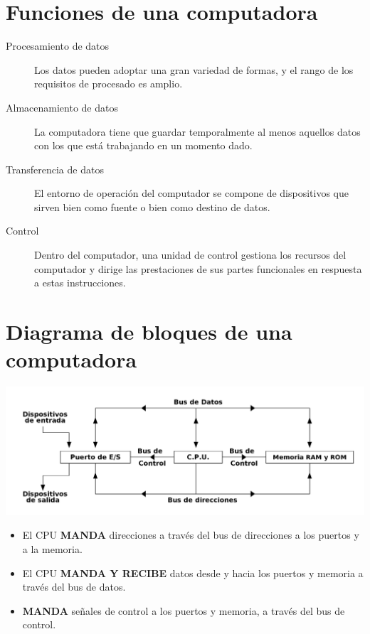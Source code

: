\documentclass[11pt]{article}
\begin{document}
\section{Funciones de una computadora}
\label{sec:org8c094fa}
\begin{description}
\item[{Procesamiento de datos}] Los datos pueden adoptar una gran variedad de formas, y el rango de los requisitos de procesado es amplio.

\item[{Almacenamiento de datos}] La computadora tiene que guardar temporalmente al menos aquellos datos con los que está trabajando en un momento dado.

\item[{Transferencia de datos}] El entorno de operación del computador se compone de dispositivos que sirven bien como fuente o bien como destino de datos.

\item[{Control}] Dentro del computador, una unidad de control gestiona los recursos del computador y dirige las prestaciones de sus partes funcionales en respuesta a estas instrucciones.
\end{description}

\section{Diagrama de bloques de una computadora}
\label{sec:orga4ad0e1}
\begin{center}
\includegraphics[width=.9\linewidth]{./img/diagramadebloques.png}
\end{center}

\begin{itemize}
\item El CPU \textbf{MANDA} direcciones a través del bus de direcciones a los puertos y a la memoria.

\item El CPU \textbf{MANDA Y RECIBE} datos desde y hacia los puertos y memoria a través del bus de datos.

\item \textbf{MANDA} señales de control a los puertos y memoria, a través del bus de control.
\end{itemize}
\end{document}
